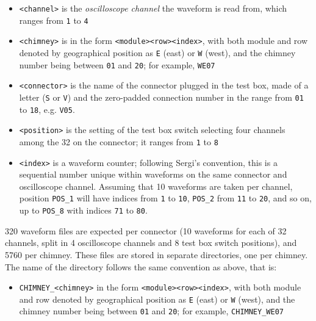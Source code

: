 \begin{itemize}
\tightlist
\item
  \texttt{\textless{}channel\textgreater{}} is the \emph{oscilloscope
  channel} the waveform is read from, which ranges from \texttt{1} to
  \texttt{4}
\item
  \texttt{\textless{}chimney\textgreater{}} is in the form
  \texttt{\textless{}module\textgreater{}\textless{}row\textgreater{}\textless{}index\textgreater{}},
  with both module and row denoted by geographical position as
  \texttt{E} (east) or \texttt{W} (west), and the chimney number being
  between \texttt{01} and \texttt{20}; for example, \texttt{WE07}
\item
  \texttt{\textless{}connector\textgreater{}} is the name of the
  connector plugged in the test box, made of a letter (\texttt{S} or
  \texttt{V}) and the zero-padded connection number in the range from
  \texttt{01} to \texttt{18}, e.g. \texttt{V05}.
\item
  \texttt{\textless{}position\textgreater{}} is the setting of the test
  box switch selecting four channels among the 32 on the connector; it
  ranges from \texttt{1} to \texttt{8}
\item
  \texttt{\textless{}index\textgreater{}} is a waveform counter;
  following Sergi's convention, this is a sequential number unique
  within waveforms on the same connector and oscilloscope channel.
  Assuming that 10 waveforms are taken per channel, position
  \texttt{POS\_1} will have indices from \texttt{1} to \texttt{10},
  \texttt{POS\_2} from \texttt{11} to \texttt{20}, and so on, up to
  \texttt{POS\_8} with indices \texttt{71} to \texttt{80}.
\end{itemize}

320 waveform files are expected per connector (10 waveforms for each of
32 channels, split in 4 oscilloscope channels and 8 test box switch
positions), and 5760 per chimney. These files are stored in separate
directories, one per chimney. The name of the directory follows the same
convention as above, that is:

\begin{itemize}
\tightlist
\item
  \texttt{CHIMNEY\_\textless{}chimney\textgreater{}} in the form
  \texttt{\textless{}module\textgreater{}\textless{}row\textgreater{}\textless{}index\textgreater{}},
  with both module and row denoted by geographical position as
  \texttt{E} (east) or \texttt{W} (west), and the chimney number being
  between \texttt{01} and \texttt{20}; for example,
  \texttt{CHIMNEY\_WE07}
\end{itemize}

